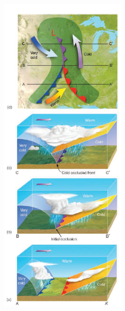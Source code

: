 \documentclass[12pt,oneside]{book}
\begin{document}
\begin{figure}

{\centering \includegraphics[width=0.8\linewidth]{figures/Figure624d} 

}
\end{figure}
\end{document}
